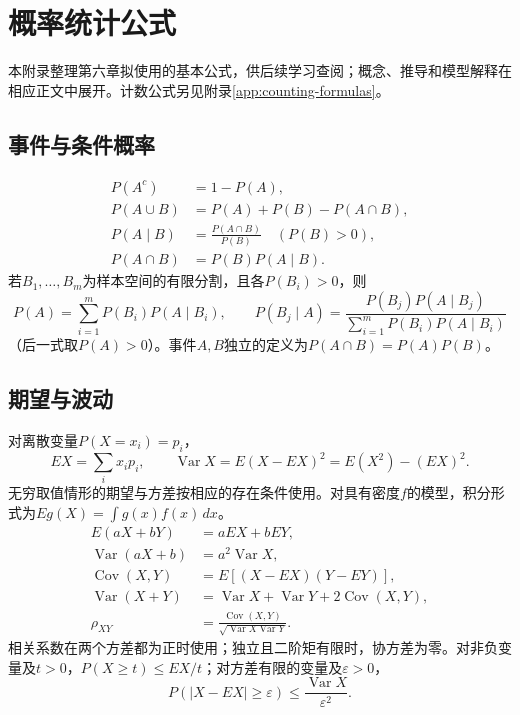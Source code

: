 \chapter{概率统计公式}
\label{app:probability-formulas}

本附录整理第六章拟使用的基本公式，供后续学习查阅；概念、推导和模型解释在相应正文中展开。计数公式另见附录\ref{app:counting-formulas}。

\section{事件与条件概率}
\begin{equation*}
 \begin{aligned}
 P(A^c)&=1-P(A),\\
 P(A\cup B)&=P(A)+P(B)-P(A\cap B),\\
 P(A\mid B)&=\frac{P(A\cap B)}{P(B)}\quad(P(B)>0),\\
 P(A\cap B)&=P(B)P(A\mid B).
 \end{aligned}
\end{equation*}
若\(B_1,\ldots,B_m\)为样本空间的有限分割，且各\(P(B_i)>0\)，则
\begin{equation*}
 P(A)=\sum_{i=1}^mP(B_i)P(A\mid B_i),\qquad
 P(B_j\mid A)=\frac{P(B_j)P(A\mid B_j)}{\sum_{i=1}^mP(B_i)P(A\mid B_i)}
\end{equation*}
（后一式取\(P(A)>0\)）。事件\(A,B\)独立的定义为\(P(A\cap B)=P(A)P(B)\)。

\section{期望与波动}

对离散变量\(P(X=x_i)=p_i\)，
\begin{equation*}
 EX=\sum_i x_ip_i,\qquad
 \operatorname{Var}X=E(X-EX)^2=E(X^2)-(EX)^2.
\end{equation*}
无穷取值情形的期望与方差按相应的存在条件使用。对具有密度\(f\)的模型，积分形式为\(Eg(X)=\int g(x)f(x)\,dx\)。
\begin{equation*}
 \begin{aligned}
 E(aX+bY)&=aEX+bEY,\\
 \operatorname{Var}(aX+b)&=a^2\operatorname{Var}X,\\
 \operatorname{Cov}(X,Y)&=E[(X-EX)(Y-EY)],\\
 \operatorname{Var}(X+Y)&=\operatorname{Var}X+\operatorname{Var}Y+2\operatorname{Cov}(X,Y),\\
 \rho_{XY}&=\frac{\operatorname{Cov}(X,Y)}{\sqrt{\operatorname{Var}X\operatorname{Var}Y}}.
 \end{aligned}
\end{equation*}
相关系数在两个方差都为正时使用；独立且二阶矩有限时，协方差为零。对非负变量及\(t>0\)，\(P(X\ge t)\le EX/t\)；对方差有限的变量及\(\varepsilon>0\)，
\begin{equation*}
 P(|X-EX|\ge\varepsilon)\le\frac{\operatorname{Var}X}{\varepsilon^2}.
\end{equation*}

